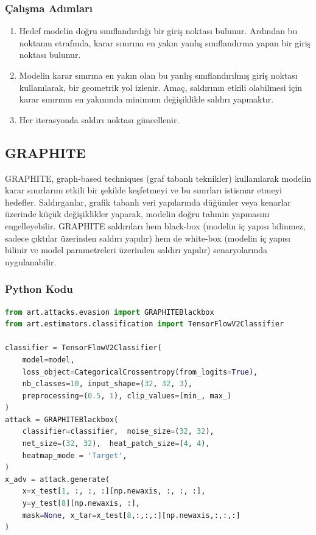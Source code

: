 \subsubsection{Çalışma Adımları}

\begin{enumerate}
    \item Hedef modelin doğru sınıflandırdığı bir giriş noktası bulunur. Ardından bu noktanın etrafında, karar sınırına en yakın yanlış sınıflandırma yapan bir giriş noktası bulunur.
    \item Modelin karar sınırına en yakın olan bu yanlış sınıflandırılmış giriş noktası kullanılarak, bir geometrik yol izlenir. Amaç, saldırının etkili olabilmesi için karar sınırının en yakınında minimum değişiklikle saldırı yapmaktır.
    \item Her iterasyonda saldırı noktası güncellenir.
\end{enumerate}

\newpage

\subsection{GRAPHITE}

GRAPHITE, graph-based techniques (graf tabanlı teknikler) kullanılarak modelin karar sınırlarını etkili bir şekilde keşfetmeyi ve bu sınırları istismar etmeyi hedefler. Saldırganlar, grafik tabanlı veri yapılarında düğümler veya kenarlar üzerinde küçük değişiklikler yaparak, modelin doğru tahmin yapmasını engelleyebilir. GRAPHITE saldırıları hem black-box (modelin iç yapısı bilinmez, sadece çıktılar üzerinden saldırı yapılır) hem de white-box (modelin iç yapısı bilinir ve model parametreleri üzerinden saldırı yapılır) senaryolarında uygulanabilir.

\subsubsection{Python Kodu}

\begin{lstlisting}[language=Python]
from art.attacks.evasion import GRAPHITEBlackbox
from art.estimators.classification import TensorFlowV2Classifier

classifier = TensorFlowV2Classifier(
    model=model,
    loss_object=CategoricalCrossentropy(from_logits=True),
    nb_classes=10, input_shape=(32, 32, 3),
    preprocessing=(0.5, 1), clip_values=(min_, max_)
)
attack = GRAPHITEBlackbox(
    classifier=classifier,  noise_size=(32, 32), 
    net_size=(32, 32),  heat_patch_size=(4, 4),
    heatmap_mode = 'Target',
)
x_adv = attack.generate(
    x=x_test[1, :, :, :][np.newaxis, :, :, :], 
    y=y_test[8][np.newaxis, :], 
    mask=None, x_tar=x_test[8,:,:,:][np.newaxis,:,:,:]
)
\end{lstlisting}

